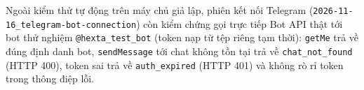 Ngoài kiểm thử tự động trên máy chủ giả lập, phiên kết nối Telegram (\texttt{2026-\hspace{0pt}11-\hspace{0pt}16\_\hspace{0pt}telegram-\hspace{0pt}bot-\hspace{0pt}connection}) còn kiểm chứng gọi trực tiếp Bot API thật tới bot thử nghiệm
\texttt{@hexta\_\hspace{0pt}test\_\hspace{0pt}bot} (token nạp từ tệp riêng tạm thời): \texttt{get\hspace{0pt}Me} trả về đúng định danh bot, \texttt{send\hspace{0pt}Message} tới chat không tồn tại trả về
\texttt{chat\_\hspace{0pt}not\_\hspace{0pt}found} (HTTP 400), token sai trả về \texttt{auth\_\hspace{0pt}expired} (HTTP 401) và không rò rỉ token trong thông điệp lỗi.

